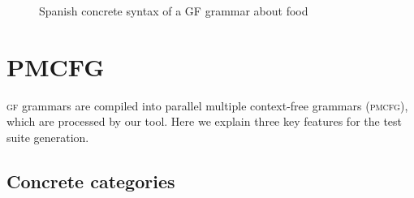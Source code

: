\documentclass[11pt]{article}
\def\gf{\textsc{gf}}
\def\pmcfg{\textsc{pmcfg}}
\begin{document}
\begin{figure}[]
\begin{Shaded}
\begin{Highlighting}[]
                  \FunctionTok{=} 
     \FunctionTok{=}  \FunctionTok{|}  \NormalTok{;}
     \FunctionTok{=}  \FunctionTok{|}  \NormalTok{;}
     \FunctionTok{=}  \FunctionTok{|}  \NormalTok{;}
  \FunctionTok{=}
      \FunctionTok{=}   \NormalTok{\{ } \OtherTok{=>}  \OtherTok{=>} 
       \FunctionTok{=} \FunctionTok{++} \FunctionTok{!}  \NormalTok{;} \FunctionTok{=}  \FunctionTok{=} 
    \FunctionTok{=}  \OtherTok{=>}  \NormalTok{; } \OtherTok{=>}  \NormalTok{\} ;}
    \FunctionTok{=}   \NormalTok{\{ } \OtherTok{=>} \FunctionTok{++}  \OtherTok{=>} \FunctionTok{++} 
\end{Highlighting}
\end{Shaded}
  \caption{Spanish concrete syntax of a GF grammar about food}
\label{fig:spanish}
\end{figure}


\section{PMCFG}
\label{sec:PMCFG}

\gf{} grammars are compiled into parallel multiple context-free
grammars (\pmcfg), which are processed by our tool. Here we explain
three key features for the test suite generation.

\subsection{Concrete categories}
\end{document}

